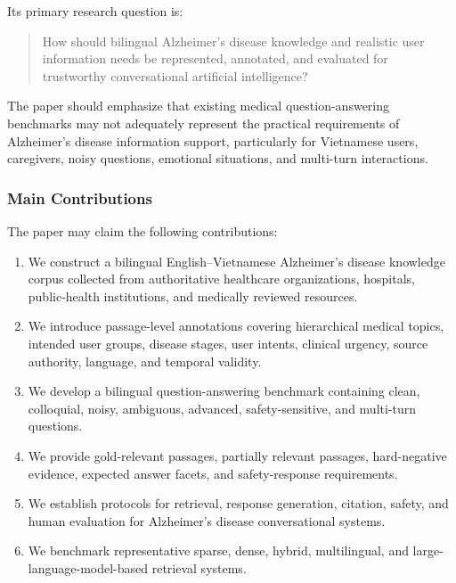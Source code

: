 \documentclass{article}
\begin{document}
Its primary research question is:
\begin{quote}
How should bilingual Alzheimer's disease knowledge and realistic user
information needs be represented, annotated, and evaluated for trustworthy
conversational artificial intelligence?
\end{quote}

The paper should emphasize that existing medical question-answering benchmarks may not adequately represent the practical requirements of Alzheimer's disease information support, particularly for Vietnamese users, caregivers, noisy questions, emotional situations, and multi-turn interactions.

\subsubsection{Main Contributions}

The paper may claim the following contributions:
\begin{enumerate}
    \item We construct a bilingual English--Vietnamese Alzheimer's disease knowledge corpus collected from authoritative healthcare organizations, hospitals, public-health institutions, and medically reviewed resources.

    \item We introduce passage-level annotations covering hierarchical medical topics, intended user groups, disease stages, user intents, clinical urgency, source authority, language, and temporal validity.

    \item We develop a bilingual question-answering benchmark containing clean, colloquial, noisy, ambiguous, advanced, safety-sensitive, and multi-turn questions.

    \item We provide gold-relevant passages, partially relevant passages, hard-negative evidence, expected answer facets, and safety-response requirements.

    \item We establish protocols for retrieval, response generation, citation, safety, and human evaluation for Alzheimer's disease conversational systems.

    \item We benchmark representative sparse, dense, hybrid, multilingual, and large-language-model-based retrieval systems.
\end{enumerate}
\end{document}
